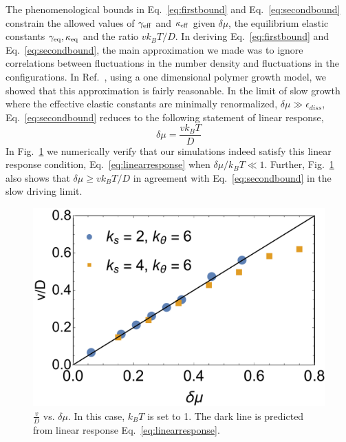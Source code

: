 \documentclass[amsmath,preprintnumbers,10pt,nofootinbib,prl,twocolumn]{revtex4-1}
\begin{document}
The phenomenological bounds in Eq.~\ref{eq:firstbound} and Eq.~\ref{eq:secondbound} constrain the allowed values of $\gamma_{\rm eff}$ and $\kappa_{\rm eff}$ given $\delta \mu$, the equilibrium elastic constants $\gamma_{\rm eq}, \kappa_{\rm eq}$ and the ratio $vk_BT/D$. In deriving Eq.~\ref{eq:firstbound} and Eq.~\ref{eq:secondbound}, the main approximation we made was to ignore correlations between fluctuations in the number density and fluctuations in the configurations. In Ref.~\cite{Nguyen2016}, using a one dimensional polymer growth model, we showed that this approximation is fairly reasonable. 
In the limit of slow growth where the effective elastic constants are minimally renormalized, $\delta\mu \gg \epsilon_{diss}$, Eq.~\ref{eq:secondbound} reduces to the following statement of linear response,
\begin{equation}
\label{eq:linearresponse}
\delta\mu=\frac{v k_B T}{D}
\end{equation}
In Fig.~\ref{fig:LinearResponse} we numerically verify that our simulations indeed satisfy this linear response condition, Eq.~\ref{eq:linearresponse} when $\delta \mu/k_B T \ll 1$. Further, Fig.~\ref{fig:LinearResponse} also shows that $\delta \mu \geq vk_BT/D$ in agreement with Eq.~\ref{eq:secondbound} in the slow driving limit.  


\begin{figure}[tbb]
\centering
\includegraphics[scale=0.50]{linearresponseregimeFig5.pdf}
\caption{$\frac{v}{D}$ vs. $\delta\mu$. In this case, $k_BT$ is set to 1. The dark line is predicted from linear response Eq.~\ref{eq:linearresponse}.} \label{fig:LinearResponse}
\end{figure} 
\end{document}
